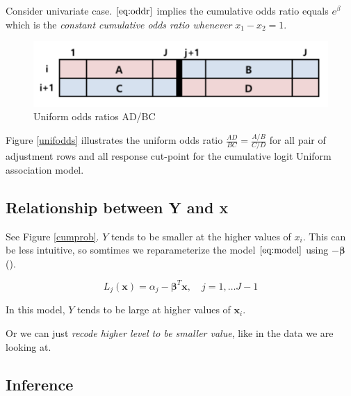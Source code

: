 \documentclass[]{book}
\begin{document}
Consider univariate case. \(\eqref{eq:oddr}\) implies the cumulative odds ratio equals \(e^\beta\) which is the \emph{constant cumulative odds ratio whenever} \(x_1 - x_2 = 1\).

\begin{figure}[H]

{\centering \includegraphics[width=0.7\linewidth]{images/unifodds} 

}

\caption{Uniform odds ratios AD/BC\label{unifodds}}\label{fig:unifodds}
\end{figure}

Figure \ref{unifodds} illustrates the uniform odds ratio \(\frac{AD}{BC} = \frac{A/B}{C/D}\) for all pair of adjustment rows and all response cut-point for the cumulative logit Uniform association model.

\hypertarget{relationship-between-y-and-x}{%
\subsection{Relationship between Y and x}\label{relationship-between-y-and-x}}

See Figure \ref{cumprob}. \(Y\) tends to be smaller at the higher values of \(x_i\). This can be less intuitive, so somtimes we reparameterize the model \(\eqref{eq:model}\) using \(-\boldsymbol\beta\) (\citet{McCullagh:1989aa}).

\begin{equation}
L_j(\mathbf{x}) = \alpha_j - \boldsymbol\beta^T\mathbf{x}, \quad j = 1, \ldots J - 1
\label{eq:reparam}
\end{equation}

In this model, \(Y\) tends to be large at higher values of \(\mathbf{x}_i\).

Or we can just \emph{recode higher level to be smaller value}, like in the data we are looking at.

\hypertarget{inference}{%
\subsection{Inference}\label{inference}}
\end{document}
